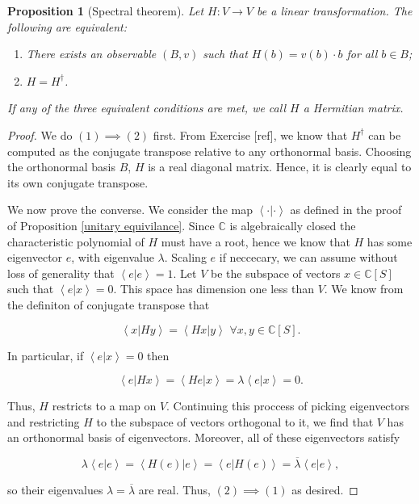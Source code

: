 \documentclass{article}
\newtheorem{proposition}{Proposition}[section]
\theoremstyle{definition}
\newcommand{\CC}{\mathbb{C}}
\newcommand{\0}{\left|0\right>}
\newcommand{\1}{\left|1\right>}
\numberwithin{figure}{section}
\begin{document}
\begin{proposition}[Spectral theorem]\label{Spectral theorem} Let $H: V\to V$ be a linear transformation. The following are equivalent:

\begin{enumerate}
\item There exists an observable $(B,v)$ such that $H(b)=v(b)\cdot b$ for all $b\in B$;
\item $H=H^{\dagger}$.
\end{enumerate}

If any of the three equivalent conditions are met, we call $H$ a Hermitian matrix.
\end{proposition}
\begin{proof} We do $(1)\implies (2)$ first. From Exercise [ref], we know that $H^{\dagger}$ can be computed as the conjugate transpose relative to any orthonormal basis. Choosing the orthonormal basis $B$, $H$ is a real diagonal matrix. Hence, it is clearly equal to its own conjugate transpose.

We now prove the converse. We consider the map $\left<\cdot |\cdot \right>$ as defined in the proof of Proposition \ref{unitary equivilance}. Since $\CC$ is algebraically closed the characteristic polynomial of $H$ must have a root, hence we know that $H$ has some eigenvector $e$, with eigenvalue $\lambda$. Scaling $e$ if neccecary, we can assume without loss of generality that $\left<e | e\right> = 1$. Let $V$ be the subspace of vectors $x\in \CC[S]$ such that $\left<e | x\right>=0$. This space has dimension one less than $V$. We know from the definiton of conjugate transpose that

$$\left<x | Hy\right>=\left<Hx |y\right>\,\, \forall x,y\in \CC[S].$$

In particular, if $\left<e | x\right>=0$ then

$$\left< e | Hx \right>=\left<He | x \right>=\lambda \left< e| x \right>=0.$$

Thus, $H$ restricts to a map on $V$. Continuing this proccess of picking eigenvectors and restricting $H$ to the subspace of vectors orthogonal to it, we find that $V$ has an orthonormal basis of eigenvectors. Moreover, all of these eigenvectors satisfy

$$\lambda \left<e | e\right>=\left<H(e) | e\right>=\left<e | H(e)\right>=\overline{\lambda}\left<e | e\right>,$$

so their eigenvalues $\lambda=\overline{\lambda}$ are real. Thus, $(2)\implies (1)$ as desired.
\end{proof}
\end{document}
